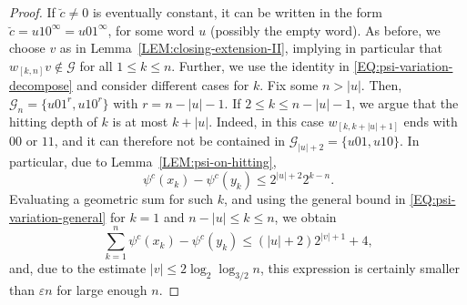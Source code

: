 \documentclass[11pt,reqno]{amsart}
\theoremstyle{plain}
\theoremstyle{definition}
\newcommand{\mc}{\mathcal}
\begin{document}
\begin{proof}
If $\breve{c} \neq 0$ is eventually constant, it can be written in the form $\breve{c} = u10^\infty = u01^\infty$, for some word $u$ (possibly the empty word). As before, we choose $v$ as in Lemma~\ref{LEM:closing-extension-II}, implying in particular that $w_{[k,n]}v \notin \mc G$ for all $1\leqslant k \leqslant n$. Further, we use the identity in \eqref{EQ:psi-variation-decompose} and consider different cases for $k$. Fix some $n > |u|$. Then, $\mc G_n = \{ u01^r, u10^r \}$  with $r = n-|u|-1$. If $2 \leqslant k \leqslant n - |u| - 1$, we argue that the hitting depth of $k$ is at most $k+|u|$. Indeed, in this case $w_{[k,k+|u| + 1]}$ ends with $00$ or $11$, and it can therefore not be contained in $\mc G_{|u| + 2} = \{ u01, u10\}$. 
In particular, due to Lemma~\ref{LEM:psi-on-hitting},
\[
\psi^c(x_k) - \psi^c(y_k) \leqslant 2^{|u| + 2} 2^{k-n}.
\]
Evaluating a geometric sum for such $k$, and using the general bound in \eqref{EQ:psi-variation-general} for $k=1$ and $n-|u| \leqslant k \leqslant n$, we obtain
\[
\sum_{k=1}^n \psi^c(x_k) - \psi^c(y_k)
\leqslant (|u| + 2) 2^{|v| + 1} + 4,
\]
and, due to the estimate $|v| \leqslant 2 \log_2 \log_{3/2} n$, this expression is certainly smaller than $\varepsilon n$ for large enough $n$.


\end{proof}
\end{document}
